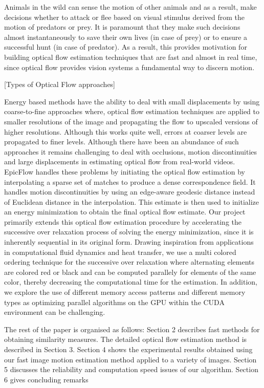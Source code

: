 \documentclass{article}
\begin{document}
\begin{multicols}{2}
Animals in the wild can sense the motion of other animals and as a result, make decisions whether to attack or flee based on visual stimulus derived from the motion of predators or prey. It is paramount that they make such decisions almost instantaneously to save their own lives (in case of prey) or to ensure a successful hunt (in case of predator). As a result, this provides motivation for building optical flow estimation techniques that are fast and almost in real time, since optical flow provides vision systems a fundamental way to discern motion. \newline

[Types of Optical Flow approaches]\newline

Energy based methods have the ability to deal with small displacements by using coarse-to-fine approaches where, optical flow estimation techniques are applied to smaller resolutions of the image and propagating the flow to upscaled versions of higher resolutions. Although this works quite well, errors at coarser levels are propagated to finer levels. 
Although there have been an abundance of such approaches it remains challenging to deal with occlusions, motion discontinuities and large displacements in estimating optical flow from real-world videos. EpicFlow handles these problems by initiating the optical flow estimation by interpolating a sparse set of matches to produce a dense correspondence field. It handles motion discontinuities by using an edge-aware geodesic distance instead of Euclidean distance in the interpolation. This estimate is then used to initialize an energy minimization to obtain the final optical flow estimate. Our project primarily extends this optical flow estimation procedure by accelerating the successive over relaxation process of solving the energy minimization, since it is inherently sequential in its original form. Drawing inspiration from applications in computational fluid dynamics and heat transfer, we use a multi colored ordering technique for the successive over relaxation where alternating elements are colored red or black and can be computed parallely for elements of the same color, thereby decreasing the computational time for the estimation. In addition, we explore the use of different memory access patterns and different memory types as optimizing parallel algorithms on the GPU within the CUDA environment can be challenging. \newline

The rest of the paper is organised as follows: Section 2 describes fast methods for obtaining similarity measures. The detailed optical flow estimation method is described in Section 3. Section 4 shows the experimental results obtained using our fast image motion estimation method applied to a variety of images. Section 5 discusses the reliability and computation speed issues of our algorithm. Section 6 gives concluding remarks	


	\end{multicols}
    
\end{document}
